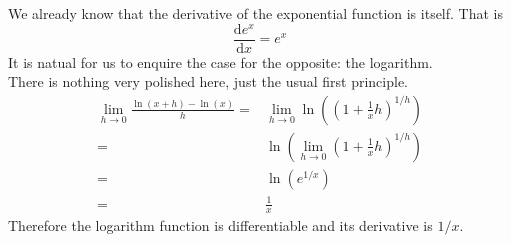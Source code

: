We already know that the derivative of the exponential function is itself.
That is
$$\frac{\mathrm de^x}{\mathrm dx}=e^x$$
It is natual for us to enquire the case for the opposite: the logarithm.\\
There is nothing very polished here, just the usual first principle.
\begin{align*}
    \lim_{h\to0}\frac{\ln(x+h)-\ln(x)}{h}
    =&\lim_{h\to0}\ln\left(\left(1+\frac{1}{x}h\right)^{1/h}\right)\\
    =&\ln\left(\lim_{h\to0}\left(1+\frac{1}{x}h\right)^{1/h}\right)\\
    =&\ln(e^{1/x})\\
    =&\frac{1}{x}
\end{align*}
Therefore the logarithm function is differentiable and its derivative is $1/x$.